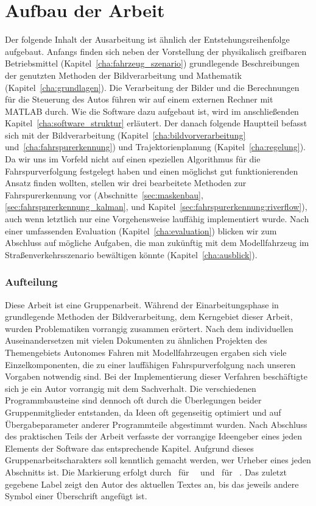 \section{Aufbau der Arbeit \dcfirstauthorshort}

Der folgende Inhalt der Ausarbeitung ist ähnlich der Entstehungsreihenfolge aufgebaut. Anfangs finden sich neben der Vorstellung der physikalisch greifbaren Betriebsmittel (Kapitel~\ref{cha:fahrzeug_szenario}) grundlegende Beschreibungen der genutzten Methoden der Bildverarbeitung und Mathematik (Kapitel~\ref{cha:grundlagen}). Die Verarbeitung der Bilder und die Berechnungen für die Steuerung des Autos führen wir auf einem externen Rechner mit MATLAB durch. Wie die Software dazu aufgebaut ist, wird im anschließenden Kapitel~\ref{cha:software_struktur} erläutert. Der danach folgende Hauptteil befasst sich mit der Bildverarbeitung (Kapitel~\ref{cha:bildvorverarbeitung} und~\ref{cha:fahrspurerkennung}) und Trajektorienplanung (Kapitel~\ref{cha:regelung}). Da wir uns im Vorfeld nicht auf einen speziellen Algorithmus für die Fahrspurverfolgung festgelegt haben und einen möglichst gut funktionierenden Ansatz finden wollten, stellen wir drei bearbeitete Methoden zur Fahrspurerkennung vor (Abschnitte~\ref{sec:maskenbau}, \ref{sec:fahrspurerkennung_kalman}, und Kapitel~\ref{sec:fahrspurerkennung:riverflow}), auch wenn letztlich nur eine Vorgehensweise lauffähig implementiert wurde. Nach einer umfassenden Evaluation (Kapitel~\ref{cha:evaluation}) blicken wir zum Abschluss auf mögliche Aufgaben, die man zukünftig mit dem Modellfahrzeug im Straßenverkehrsszenario bewältigen könnte (Kapitel~\ref{cha:ausblick}).

\subsubsection{Aufteilung \dcsecondauthorshort}

Diese Arbeit ist eine Gruppenarbeit.
Während der Einarbeitungsphase in grundlegende Methoden der Bildverarbeitung, dem Kerngebiet dieser Arbeit, wurden Problematiken vorrangig zusammen erörtert. Nach dem individuellen Auseinandersetzen mit vielen Dokumenten zu ähnlichen Projekten des Themengebiets \glqq Autonomes Fahren mit Modellfahrzeugen\grqq{} ergaben sich viele Einzelkomponenten, die zu einer lauffähigen Fahrspurverfolgung nach unseren Vorgaben notwendig sind. Bei der Implementierung dieser Verfahren beschäftigte sich je ein Autor vorrangig mit dem Sachverhalt. Die verschiedenen Programmbausteine sind dennoch oft durch die Überlegungen beider Gruppenmitglieder entstanden, da Ideen oft gegenseitig optimiert und auf Übergabeparameter anderer Programmteile abgestimmt wurden. Nach Abschluss des praktischen Teils der Arbeit verfasste der vorrangige Ideengeber eines jeden Elements der Software das entsprechende Kapitel.   
Aufgrund dieses Gruppenarbeitscharakters soll kenntlich gemacht werden, wer Urheber eines jeden Abschnitts ist. Die Markierung erfolgt durch \dcfirstauthorshort\ für \dcfirstauthorfirstname\ \dcfirstauthorlastname\  und \dcsecondauthorshort\  für \dcsecondauthorfirstname\ \dcsecondauthorlastname{}. Das zuletzt gegebene Label zeigt den Autor des aktuellen Textes an, bis das jeweils andere Symbol einer Überschrift angefügt ist.


